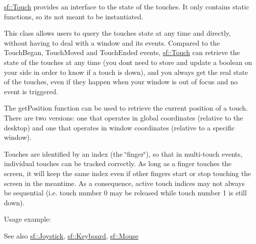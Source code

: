 \mbox{\hyperlink{classsf_1_1_touch}{sf\+::\+Touch}} provides an interface to the state of the touches. It only contains static functions, so it\textquotesingle{}s not meant to be instantiated.

This class allows users to query the touches state at any time and directly, without having to deal with a window and its events. Compared to the Touch\+Began, Touch\+Moved and Touch\+Ended events, \mbox{\hyperlink{classsf_1_1_touch}{sf\+::\+Touch}} can retrieve the state of the touches at any time (you don\textquotesingle{}t need to store and update a boolean on your side in order to know if a touch is down), and you always get the real state of the touches, even if they happen when your window is out of focus and no event is triggered.

The get\+Position function can be used to retrieve the current position of a touch. There are two versions\+: one that operates in global coordinates (relative to the desktop) and one that operates in window coordinates (relative to a specific window).

Touches are identified by an index (the \char`\"{}finger\char`\"{}), so that in multi-\/touch events, individual touches can be tracked correctly. As long as a finger touches the screen, it will keep the same index even if other fingers start or stop touching the screen in the meantime. As a consequence, active touch indices may not always be sequential (i.\+e. touch number 0 may be released while touch number 1 is still down).

Usage example\+: 
\begin{DoxyCode}{0}
\DoxyCodeLine{\{}
\DoxyCodeLine{    \textcolor{comment}{// touch 0 is down}}
\DoxyCodeLine{\}}
\DoxyCodeLine{}
\DoxyCodeLine{\textcolor{comment}{// get global position of touch 1}}
\DoxyCodeLine{}
\DoxyCodeLine{\textcolor{comment}{// get position of touch 1 relative to a window}}
\end{DoxyCode}


\begin{DoxySeeAlso}{See also}
\mbox{\hyperlink{classsf_1_1_joystick}{sf\+::\+Joystick}}, \mbox{\hyperlink{classsf_1_1_keyboard}{sf\+::\+Keyboard}}, \mbox{\hyperlink{classsf_1_1_mouse}{sf\+::\+Mouse}} \begin{DoxyVerb}\end{DoxyVerb}
 
\end{DoxySeeAlso}


